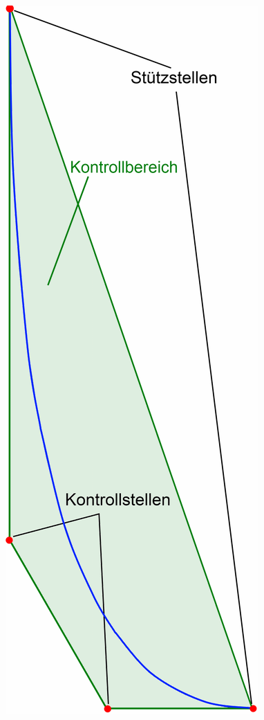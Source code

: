 \hfill    
\begin{minipage}[c]{4cm}
  	\includegraphics[width=\textwidth]{bilder/bernsteinBezier}
\end{minipage}

